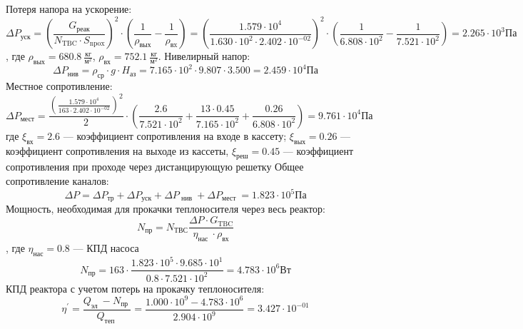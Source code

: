 \noindent Потеря напора на ускорение:
\begin{equation}
\Delta P_{\mathrm{уск}} = \left( \frac{G_{\text{реак}}}{N_{\mathrm{TBC}} \cdot S_{\mathrm{npox}}} \right)^{2} \cdot \left(\frac{1}{\rho_{\mathrm{вых}}} - \frac{1}{\rho_{\mathrm{вx}}} \right)
=
\left( \frac{ 1.579 \cdot 10^{ 4 } } { 1.630 \cdot 10^{ 2 } \cdot 2.402 \cdot 10^{ -02 } } \right)^2 \cdot \left(\frac 1 { 6.808 \cdot 10^{ 2 } } - \frac 1  { 7.521 \cdot 10^{ 2 } } \right) =  2.265 \cdot 10^{ 3 } \text{Па}
\end{equation}, где $\rho_{\text{вых}} = 680.8\ \frac{\text{кг}}{\text{м}^2} $, $\rho_{\text{вх}} =752.1\  \frac {\text{кг}}{\text{м}^2}$.
\newline
\noindent Нивелирный напор:
$$
\Delta P_{\text{нив}} = \rho_{\text{ср}} \cdot g \cdot H_{\text{аз}}
=
7.165 \cdot 10^{ 2 } \cdot 9.807 \cdot 3.500  = 2.459 \cdot 10^{ 4 } \text{Па}
$$
Местное сопротивление:
$$
\Delta P_{\text{мест}} = \frac{ \left( \frac{1.579 \cdot 10^{ 4 }} {163 \cdot 2.402 \cdot 10^{ -02 } }  \right)^2 } {2} \cdot \left( \frac{ 2.6 }{ 7.521 \cdot 10^{ 2 } } +\frac{ 13 \cdot 0.45 }{7.165 \cdot 10^{ 2 }}+\frac{0.26} { 6.808 \cdot 10^{ 2 } } \right) = 9.761 \cdot 10^{ 4 } \text{Па}
$$
где $\xi_{\text{вх}}= 2.6 $ — коэффициент сопротивления на входе в кассету; $\xi_{\text{вых}} = 0.26$ — коэффициент сопротивления на выходе из кассеты, $\xi_{\text{реш}} = 0.45$ — коэффициент сопротивления при проходе через дистанцирующую решетку %
Общее сопротивление каналов:
$$
\Delta P=\Delta P_{\mathrm{тр}}+\Delta P_{\mathrm{уск}}+\Delta P_{\text { нив }}+\Delta P_{\text {мест }} = 1.823 \cdot 10^{ 5 } \text{Па} 
$$
Мощность, необходимая для прокачки теплоносителя через весь реактор:
$$
N_{\mathrm{пр}}=N_{\mathrm{ТВС}} \frac{\Delta P \cdot G_{\mathrm{TBC}}}{\eta_{\text {нас }} \cdot \rho_{\mathrm{вх}}}
$$, где $\eta_{\text{нас}}=0.8$ — КПД насоса
\[
    N_{\text{пр}} = 163 \cdot \frac {1.823 \cdot 10^{ 5 } \cdot 9.685 \cdot 10^{ 1 }} {0.8 \cdot 7.521 \cdot 10^{ 2 }} = 4.783 \cdot 10^{ 6 } \text{Вт}
\]
\noindent КПД реактора с учетом потерь на прокачку теплоносителя:
$$
\eta^{\prime} = \frac{Q_{\text {эл }}-N_{\text {пр }}}{Q_{\text {теп }}}=\frac{1.000 \cdot 10^{ 9 } - 4.783 \cdot 10^{ 6 }}{2.904 \cdot 10^{ 9 }}={3.427 \cdot 10^{ -01 }}
$$
